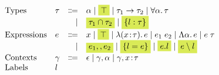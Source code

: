 \[
\begin{array}{l}
  \begin{array}{llrl}
    \text{Types}
    & \tau & \Coloneqq & \alpha \mid \highlight{$\top$} \mid \tau_1 \to \tau_2 \mid \for \alpha \tau \\
    &      & \mid      & \highlight{$\tau_1 \intersect \tau_2$} \mid \highlight{$\recordType l \tau$} \\
    \text{Expressions}
    & e & \Coloneqq & x \mid \highlight{$\top$} \mid \lam x \tau e \mid \app {e_1} {e_2} \mid \blam \alpha e \mid \tapp e \tau \\
    &   & \mid      & \highlight {$e_1 \mergeOp e_2$} \mid \highlight {$\recordCon l e$} \mid
                      \highlight {$e.l$} \mid \highlight{$e \restrictOp l$} \\
    \text{Contexts}
    & \gamma & \Coloneqq & \epsilon \mid \gamma, \alpha \mid \gamma, x \hast \tau \\
    \text{Labels} & l
  \end{array}
\end{array}
\]
